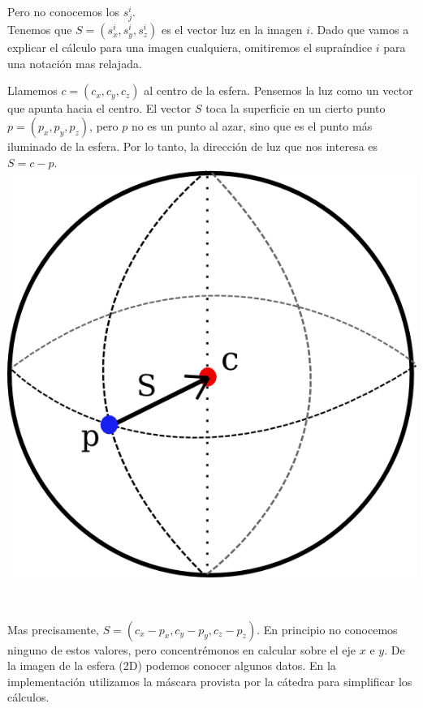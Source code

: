 Pero no conocemos los $s_{j}^{i}$. \\

Tenemos que $S = (s_{x}^{i}, s_{y}^{i}, s_{z}^{i})$ es el vector luz en la imagen $i$. Dado que vamos a explicar el cálculo para una imagen cualquiera, omitiremos el supraíndice $i$ para una notación mas relajada.

Llamemos $c = (c_{x}, c_{y}, c_{z})$ al centro de la esfera. Pensemos la luz como un vector que apunta hacia el centro. El vector $S$ toca la superficie en un cierto punto $p = (p_{x}, p_{y}, p_{z})$, pero $p$ no es un punto al azar, sino que es el punto más iluminado de la esfera. Por lo tanto, la dirección de luz que nos interesa es $S =  c - p$.\\

{\centering
    \includegraphics[scale=0.9]{informe/imagenes/esfera/esferaModelo.png} \\
}

$ $\newline

Mas precisamente, $S = (c_{x} - p_{x}, c_{y} - p_{y}, c_{z} - p_{z}).$ En principio no conocemos ninguno de estos valores, pero concentrémonos en calcular sobre el eje $x$ e $y$. De la imagen de la esfera (2D) podemos conocer algunos datos. En la implementación utilizamos la máscara provista por la cátedra para simplificar los cálculos. \\

